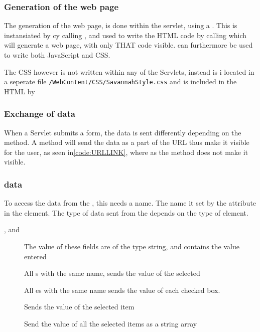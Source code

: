 \subsubsection{Generation of the web page}
The generation of the web page, is done within the servlet, using a . This is instansiated by cy calling , and used to write the HTML code by calling  which will generate a web page, with only THAT code visible.  can furthermore be used to write both JavaScript and CSS.

The CSS however is not written within any of the Servlets, instead is i located in a seperate file \verb+/WebContent/CSS/SavannahStyle.css+ and is included in the HTML by 


\subsubsection{Exchange of data}
When a Servlet submits a form, the data is sent differently depending on the  method. A  method will send the data as a part of the URL thus make it visible for the user, as seen in\autoref{code:URLLINK}, where as the  method does not make it visible.

\subsubsection{ data}
To access the data from the , this needs a name. The name it set by the  attribute in the  element. The type of data sent from the  depends on the type of element.
\begin{description}
	\item[, and ] The value of these fields are of the type string, and contains the value entered
	\item[] All s with the same name, sends the value of the selected 
	\item[] All es with the same name sends the value of each checked box.
	\item[] Sends the value of the selected item
	\item[] Send the value of all the selected items as a string array
\end{description}

